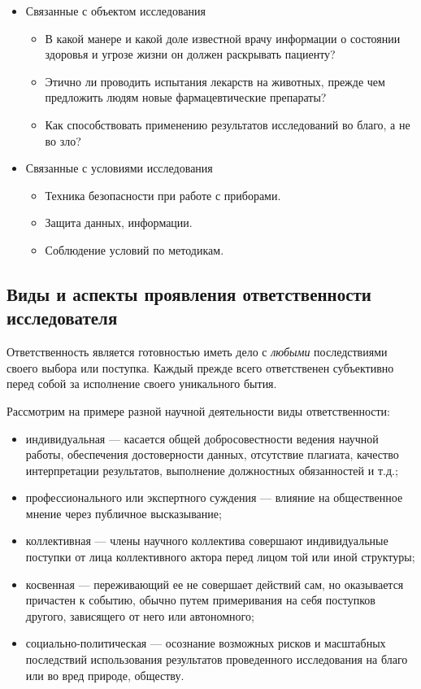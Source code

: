 \begin{itemize}
    \item Связанные с объектом исследования
    \begin{itemize}
        \item В какой манере и какой доле известной врачу информации о состоянии здоровья и угрозе жизни он должен раскрывать пациенту?
        \item Этично ли проводить испытания лекарств на животных, прежде чем предложить людям новые фармацевтические препараты?
        \item Как способствовать применению результатов исследований во благо, а не во зло?
    \end{itemize}
    \item Связанные с условиями исследования
    \begin{itemize}
        \item Техника безопасности при работе с приборами.
        \item Защита данных, информации.
        \item Соблюдение условий по методикам.
    \end{itemize}
\end{itemize}

\subsection{Виды и аспекты проявления ответственности исследователя}

Ответственность является готовностью иметь дело с \textit{любыми} последствиями своего выбора или поступка. Каждый прежде всего ответственен субъективно перед собой за исполнение своего уникального бытия.

Рассмотрим на примере разной научной деятельности виды ответственности: 
\begin{itemize}
    \item индивидуальная --- касается общей добросовестности ведения научной работы,
    обеспечения достоверности данных, отсутствие плагиата, качество интерпретации
    результатов, выполнение должностных обязанностей и т.д.;
    \item профессионального или экспертного суждения --- влияние на общественное
    мнение через публичное высказывание;
    \item коллективная --- члены научного коллектива совершают индивидуальные поступки от лица коллективного актора перед лицом той или иной структуры;
    \item косвенная --- переживающий ее не совершает действий сам, но оказывается причастен к событию, обычно путем примеривания на себя поступков другого, зависящего от него или автономного;
    \item социально-политическая --- осознание возможных рисков и масштабных последствий использования результатов проведенного исследования на благо или во вред природе, обществу.
\end{itemize}

